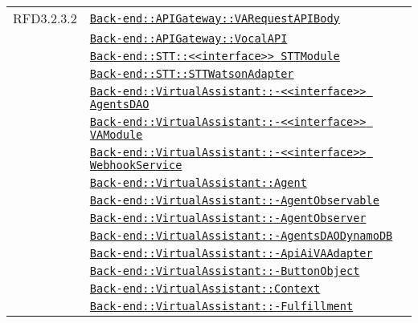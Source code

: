 \begin{longtable}{|>{\centering}m{3cm}|m{10cm}<{\centering}|}
RFD3.2.3.2 & \hyperref[Back-end::APIGateway::VARequestAPIBody]{\texttt{Back-end::APIGateway::VARequestAPIBody}}\\
& \hyperref[Back-end::APIGateway::VocalAPI]{\texttt{Back-end::APIGateway::VocalAPI}}\\
& \hyperref[Back-end::STT::<<interface>> STTModule]{\texttt{Back-end::STT::<<interface>> STTModule}}\\
& \hyperref[Back-end::STT::STTWatsonAdapter]{\texttt{Back-end::STT::STTWatsonAdapter}}\\
& \hyperref[Back-end::VirtualAssistant::<<interface>> AgentsDAO]{\texttt{Back-end::VirtualAssistant::-\linebreak <<interface>> AgentsDAO}}\\
& \hyperref[Back-end::VirtualAssistant::<<interface>> VAModule]{\texttt{Back-end::VirtualAssistant::-\linebreak <<interface>> VAModule}}\\
& \hyperref[Back-end::VirtualAssistant::<<interface>> WebhookService]{\texttt{Back-end::VirtualAssistant::-\linebreak <<interface>> WebhookService}}\\
& \hyperref[Back-end::VirtualAssistant::Agent]{\texttt{Back-end::VirtualAssistant::Agent}}\\
& \hyperref[Back-end::VirtualAssistant::AgentObservable]{\texttt{Back-end::VirtualAssistant::-\linebreak AgentObservable}}\\
& \hyperref[Back-end::VirtualAssistant::AgentObserver]{\texttt{Back-end::VirtualAssistant::-\linebreak AgentObserver}}\\
& \hyperref[Back-end::VirtualAssistant::AgentsDAODynamoDB]{\texttt{Back-end::VirtualAssistant::-\linebreak AgentsDAODynamoDB}}\\
& \hyperref[Back-end::VirtualAssistant::ApiAiVAAdapter]{\texttt{Back-end::VirtualAssistant::-\linebreak ApiAiVAAdapter}}\\
& \hyperref[Back-end::VirtualAssistant::ButtonObject]{\texttt{Back-end::VirtualAssistant::-\linebreak ButtonObject}}\\
& \hyperref[Back-end::VirtualAssistant::Context]{\texttt{Back-end::VirtualAssistant::Context}}\\
& \hyperref[Back-end::VirtualAssistant::Fulfillment]{\texttt{Back-end::VirtualAssistant::-\linebreak Fulfillment}}\\

\end{longtable}
